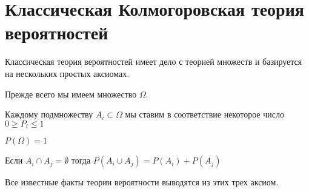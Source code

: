 \section{Классическая Колмогоровская теория вероятностей}

Классическая теория вероятностей имеет дело с теорией множеств и
базируется на нескольких простых аксиомах. 

Прежде всего мы имеем множество $\Omega$.
\begin{axiom}
\label{axProbabilityKolmogorov1}
Каждому подмножеству $A_i \subset \Omega$ мы ставим в соответствие
некоторое число $0 \ge P_i \le 1$
\end{axiom}

\begin{axiom}
\label{axProbabilityKolmogorov2}
$P\left(\Omega\right) = 1$
\end{axiom}

\begin{axiom}
\label{axProbabilityKolmogorov3}
Если $A_i \cap A_j = \emptyset$ тогда 
$P\left(A_i \cup A_j\right) = P\left(A_i\right) + P\left(A_j\right)$
\end{axiom}

Все известные факты теории вероятности выводятся из этих трех аксиом.  


